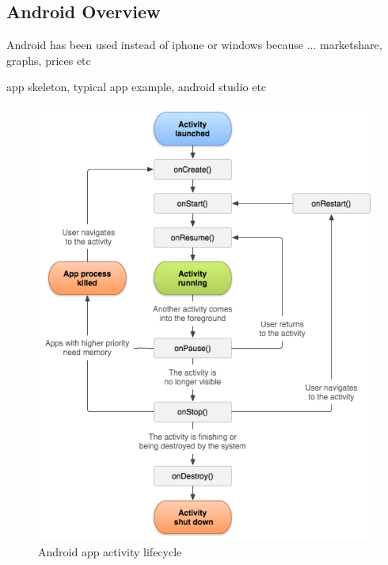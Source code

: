 \subsection{Android Overview}

Android has been used instead of iphone or windows because ... marketshare, graphs, prices etc


app skeleton, typical app example, android studio etc



\begin{figure}[H]
      \centering
      \includegraphics[scale=.8]{images/Diagrams/android_activity_lifecycle.png}
      \caption{Android app activity lifecycle }
      \label{androidActivity}
  \end{figure}
  \bigskip




